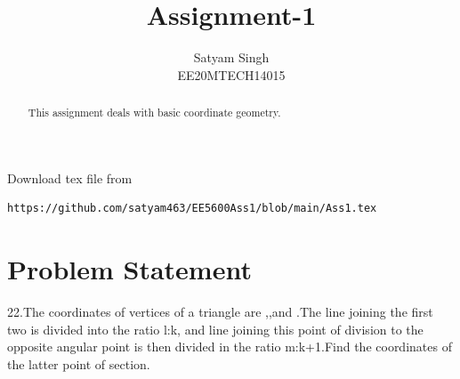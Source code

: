 \documentclass[journal,12pt,twocolumn]{IEEEtran}
\begin{document}
\renewcommand{\thefigure}{\theproblem}
\def\putbox#1#2#3{\makebox[0in][l]{\makebox[#1][l]{}\raisebox{\baselineskip}[0in][0in]{\raisebox{#2}[0in][0in]{#3}}}}
     \def\rightbox#1{\makebox[0in][r]{#1}}
     \def\centbox#1{\makebox[0in]{#1}}
     \def\topbox#1{\raisebox{-\baselineskip}[0in][0in]{#1}}
     \def\midbox#1{\raisebox{-0.5\baselineskip}[0in][0in]{#1}}
\vspace{3cm}
\title{Assignment-1}
\author{Satyam Singh \\ EE20MTECH14015}
\maketitle
\newpage
\bigskip
\renewcommand{\thefigure}{\theenumi}
\renewcommand{\thetable}{\theenumi}
\begin{abstract}
This assignment deals with basic coordinate geometry.
\end{abstract}
Download  tex file from 
\begin{lstlisting}
https://github.com/satyam463/EE5600Ass1/blob/main/Ass1.tex
\end{lstlisting}
\section{Problem Statement}
22.The coordinates of vertices of a triangle are ,,and .The line joining the first two is divided into the ratio l:k, and line joining this point of division to the opposite angular point is then divided in the ratio m:k+1.Find the coordinates of the latter point of section.
\end{document}
